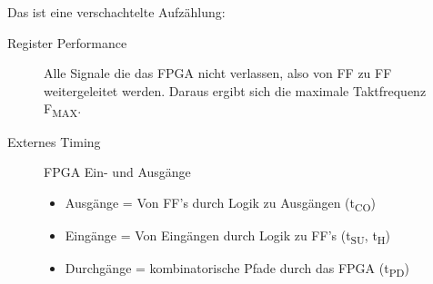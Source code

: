 Das ist eine verschachtelte Aufzählung:
\begin{description}
		\item [Register Performance] Alle Signale die das FPGA nicht verlassen, also von FF zu FF weitergeleitet werden. Daraus ergibt sich die maximale Taktfrequenz F\textsubscript{MAX}.

		\item [Externes Timing] FPGA Ein- und Ausgänge
		\begin{itemize}
			\item Ausgänge = Von FF's durch Logik zu Ausgängen (t\textsubscript{CO})
			\item Eingänge = Von Eingängen durch Logik zu FF's (t\textsubscript{SU}, t\textsubscript{H})
			\item Durchgänge = kombinatorische Pfade durch das FPGA (t\textsubscript{PD})
		\end{itemize}
\end{description}
